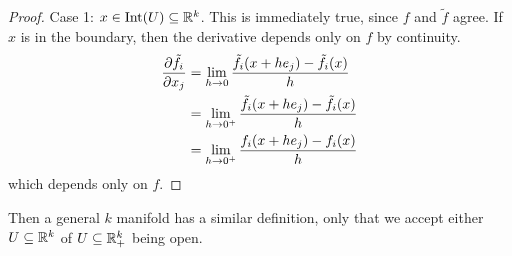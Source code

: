 \documentclass[12pt]{article}
\begin{document}
\begin{proof}
    Case 1: $x \in \text{Int}(U) \subseteq \mathbb{R}^k$. This is immediately true, since $f$ and $\tilde f$ agree. If $x$ is in the boundary, then the derivative depends only on $f$ by continuity.
    \begin{align*}
        \frac{\partial \tilde f_i}{\partial x_j} &= \lim_{h\rightarrow0} \frac{\tilde f_i(x + he_j) - \tilde f_i(x)}{h} \\
                              &= \lim_{h\rightarrow0^+} \frac{\tilde f_i(x + he_j) - \tilde f_i(x)}{h} \\
                              &= \lim_{h\rightarrow0^+} \frac{f_i(x + he_j) - f_i(x)}{h}
    \end{align*}
    which depends only on $f$.
\end{proof}

Then a general $k$ manifold has a similar definition, only that we accept either $U \subseteq \mathbb{R}^k$ of $U \subseteq \mathbb{R}^k_+$ being open.
\end{document}
